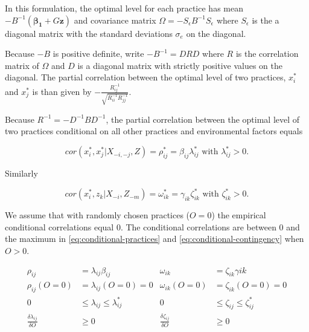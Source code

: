 \documentclass[12pt]{article}
\begin{document}
In this formulation, the optimal level for each practice has mean $-B^{-1} (\mathbf{\beta_1} + G \mathbf{z})$ and covariance matrix $\Omega = -S_{\epsilon} B^{-1} S_{\epsilon}$ where $S_{\epsilon}$ is the a diagonal matrix with the standard deviations $\sigma_e$ on the diagonal. 

Because $-B$ is positive definite, write $-B^{-1} = DRD$ where $R$ is the correlation matrix of $\Omega$ and $D$ is a diagonal matrix with strictly positive values on the diagonal. The partial correlation between the optimal level of two practices, $x^*_i$ and $x^*_j$ is than given by $-\frac{R^{-1}_{ij}}{\sqrt{R^{-1}_{ii} R^{-1}_{jj}}}$. 

Because $R^{-1} = - D^{-1}BD^{-1}$, the partial correlation between the optimal level of two practices conditional on all other practices and environmental factors equals 

\begin{equation}\label{eq:conditional-practices}
cor(x_i^*, x_j^* | X_{-i, -j}, Z)  = \rho^*_{ij} = \beta_{ij}\lambda_{ij}^* \text{ with } \lambda_{ij}^* > 0. 
\end{equation}

Similarly

\begin{equation}\label{eq:conditional-contingency}
cor(x_i^*, z_k | X_{-i}, Z_{-m})  = \omega^*_{ik} = \gamma_{ik}\zeta_{ik}^* \text{ with } \zeta_{ik}^* > 0. 
\end{equation}
 
We assume that with randomly chosen practices ($O = 0$) the empirical conditional correlations equal $0$. The conditional correlations are between $0$ and the maximum in \eqref{eq:conditional-practices} and \eqref{eq:conditional-contingency} when $O > 0$.

\begin{align*}
\rho_{ij} &= \lambda_{ij} \beta_{ij}
& \omega_{ik} &= \zeta_{ik} \gamma{ik} \\
\rho_{ij}(O = 0) &= \lambda_{ij}(O = 0) = 0 
& \omega_{ik}(O = 0) &= \zeta_{ik}(O = 0) = 0 \\
0 & \leq \lambda_{ij} \leq \lambda^*_{ij}
& 0 & \leq \zeta_{ij} \leq \zeta^*_{ij} \\
\frac{\delta \lambda_{ij}}{\delta O} & \geq 0 
& \frac{\delta \zeta_{ij}}{\delta O} & \geq 0 
\end{align*}
 
% 
 
\end{document}
